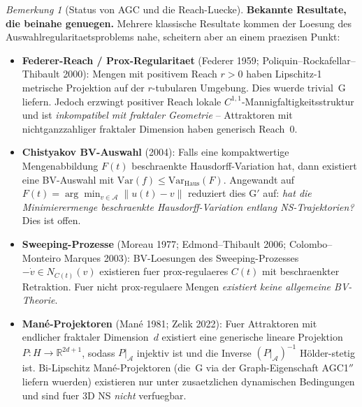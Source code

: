 \documentclass[12pt,a4paper]{article}
\theoremstyle{definition}
\theoremstyle{plain}
\theoremstyle{remark}
\newtheorem{remark}[definition]{Bemerkung}
\begin{document}
\begin{remark}[Status von AGC und die Reach-Luecke]
\medskip\noindent
\textbf{Bekannte Resultate, die beinahe genuegen.}\;
Mehrere klassische Resultate kommen der Loesung des Auswahlregularitaetsproblems nahe,
scheitern aber an einem praezisen Punkt:
\begin{itemize}
  \item \textbf{Federer-Reach / Prox-Regularitaet}
    (Federer 1959; Poliquin--Rockafellar--Thibault 2000):
    Mengen mit positivem Reach $r > 0$ haben Lipschitz-1 metrische Projektion
    auf der $r$-tubularen Umgebung. Dies wuerde trivial~G liefern.
    Jedoch erzwingt positiver Reach lokale $C^{1,1}$-Mannigfaltigkeitsstruktur
    und ist \emph{inkompatibel mit fraktaler Geometrie} -- Attraktoren
    mit nichtganzzahliger fraktaler Dimension haben generisch Reach~$0$.
  \item \textbf{Chistyakov BV-Auswahl} (2004):
    Falls eine kompaktwertige Mengenabbildung $F(t)$ beschraenkte Hausdorff-Variation hat,
    dann existiert eine BV-Auswahl mit
    $\mathrm{Var}(f) \le \mathrm{Var}_{\mathrm{Haus}}(F)$.
    Angewandt auf $F(t) = \arg\min_{v \in \mathcal{A}} \|u(t)-v\|$
    reduziert dies G$'$ auf: \emph{hat die Minimierermenge beschraenkte
    Hausdorff-Variation entlang NS-Trajektorien?} Dies ist offen.
  \item \textbf{Sweeping-Prozesse}
    (Moreau 1977; Edmond--Thibault 2006; Colombo--Monteiro Marques 2003):
    BV-Loesungen des Sweeping-Prozesses $-\dot{v} \in N_{C(t)}(v)$
    existieren fuer prox-regulaeres $C(t)$ mit beschraenkter Retraktion.
    Fuer nicht prox-regulaere Mengen \emph{existiert keine allgemeine BV-Theorie}.
  \item \textbf{Man\'e-Projektoren}
    (Man\'e 1981; Zelik 2022):
    Fuer Attraktoren mit endlicher fraktaler Dimension~$d$ existiert eine
    generische lineare Projektion $P : H \to \mathbb{R}^{2d+1}$, sodass
    $P|_{\mathcal{A}}$ injektiv ist und die Inverse
    $(P|_{\mathcal{A}})^{-1}$ H\"older-stetig ist.
    Bi-Lipschitz Man\'e-Projektoren (die~G via der Graph-Eigenschaft
    AGC1$''$ liefern wuerden) existieren nur unter zusaetzlichen dynamischen Bedingungen
    und sind fuer 3D NS \emph{nicht} verfuegbar.
\end{itemize}


\end{remark}
\end{document}
